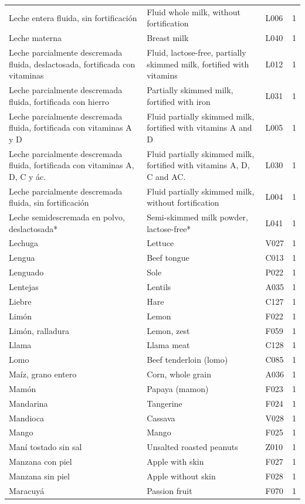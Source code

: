 {\begin{longtable}{p{4.3cm}p{5.5cm}p{1.5cm}p{0.7cm}}
Leche entera fluida, sin fortificación & Fluid whole milk, without fortification & L006 & 1\\
Leche materna & Breast milk & L040 & 1\\
Leche parcialmente descremada fluida, deslactosada, fortificada con vitaminas & Fluid, lactose-free, partially skimmed milk, fortified with vitamins & L012 & 1\\
Leche parcialmente descremada fluida, fortificada con hierro & Partially skimmed milk, fortified with iron & L031 & 1\\
Leche parcialmente descremada fluida, fortificada con vitaminas A y D & Fluid partially skimmed milk, fortified with vitamins A and D & L005 & 1\\
Leche parcialmente descremada fluida, fortificada con vitaminas A, D, C y ác. & Fluid partially skimmed milk, fortified with vitamins A, D, C and AC. & L030 & 1\\
Leche parcialmente descremada fluida, sin fortificación & Fluid partially skimmed milk, without fortification & L004 & 1\\
Leche semidescremada en polvo, deslactosada* & Semi-skimmed milk powder, lactose-free* & L041 & 1\\
Lechuga & Lettuce & V027 & 1\\
Lengua & Beef tongue & C013 & 1\\
Lenguado & Sole & P022 & 1\\
Lentejas & Lentils & A035 & 1\\
Liebre & Hare & C127 & 1\\
Limón & Lemon & F022 & 1\\
Limón, ralladura & Lemon, zest & F059 & 1\\
Llama & Llama meat & C128 & 1\\
Lomo & Beef tenderloin (lomo) & C085 & 1\\
Maíz, grano entero & Corn, whole grain & A036 & 1\\
Mamón & Papaya (mamon) & F023 & 1\\
Mandarina & Tangerine & F024 & 1\\
Mandioca & Cassava & V028 & 1\\
Mango & Mango & F025 & 1\\
Maní tostado sin sal & Unsalted roasted peanuts & Z010 & 1\\
Manzana con piel & Apple with skin & F027 & 1\\
Manzana sin piel & Apple without skin & F028 & 1\\
Maracuyá & Passion fruit & F070 & 1\\

\end{longtable}}
